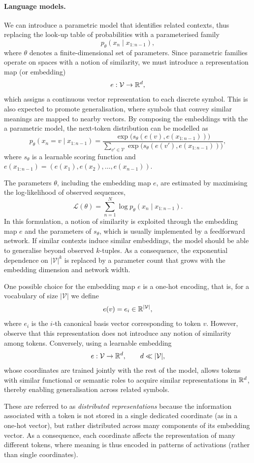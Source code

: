 \paragraph{Language models.}
We can introduce a parametric model that identifies related contexts, thus replacing the look-up table of probabilities with a parameterised family
\[
p_\theta(x_n \mid x_{1:n-1}),
\]
where $\theta$ denotes a finite-dimensional set of parameters. Since parametric families operate on spaces with a notion of similarity, we must introduce a representation map (or embedding)
\[
e : \mathcal{V} \to {\mathbb R}^d,
\]
which assigns a continuous vector representation to each discrete symbol. This is also expected to promote generalisation, where symbols that convey similar meanings are mapped to nearby vectors. By composing the embeddings with the a parametric model, the next-token distribution can be modelled as
\[
p_\theta(x_n = v \mid x_{1:n-1})
=
\frac{\exp\big( s_\theta(e(v), e(x_{1:n-1})) \big)}
{\sum_{v' \in \mathcal{V}} \exp\big( s_\theta(e(v'), e(x_{1:n-1})) \big)},
\]
where $s_\theta$ is a learnable scoring function and $e(x_{1:n-1}) = (e(x_{1}), e(x_{2}), \ldots, e(x_{n-1}))$.

The parameters $\theta$, including the embedding map $e$, are estimated by maximising the log-likelihood of observed sequences,
\[
\mathcal{L}(\theta)
=
\sum_{n=1}^{N}
\log p_\theta(x_n \mid x_{1:n-1}). 
\]
In this formulation, a notion of similarity is exploited through the embedding map $e$ and the parameters of $s_\theta$, which is usually implemented by a feedforward network. If similar contexts induce similar embeddings, the model should be able to generalise beyond observed $k$-tuples. As a consequence, the exponential dependence on $|\mathcal{V}|^k$ is replaced by a parameter count that grows with the embedding dimension and network width.

\begin{remark}
One possible choice for the embedding map $e$ is a one-hot encoding,  that is, for a vocabulary of size $|\mathcal{V}|$ we define
\[
e(v) = e_i \in {\mathbb R}^{|\mathcal{V}|},
\]
where $e_i$ is the $i$-th canonical basis vector corresponding to token $v$. However, observe that this representation does not introduce any notion of similarity among tokens. Conversely, using a learnable embedding
\[
e : \mathcal{V} \to {\mathbb R}^d,
\qquad d \ll |\mathcal{V}|,
\]
whose coordinates are trained jointly with the rest of the model, allows tokens with similar functional or semantic roles to acquire similar representations in ${\mathbb R}^d$, thereby enabling generalisation across related symbols.

These are referred to as \emph{distributed representations} \cite{bengio2003neural} because the information associated with a token is not stored in a single dedicated coordinate (as in a one-hot vector), but rather distributed across many components of its embedding vector. As a consequence, each coordinate affects the representation of many different tokens, where meaning is thus encoded in patterns of activations (rather than single coordinates).
\end{remark}

